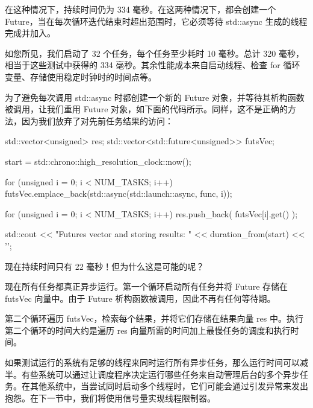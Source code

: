 在这种情况下，持续时间仍为 334 毫秒。在这两种情况下，都会创建一个 Future，当在每次循环迭代结束时超出范围时，它必须等待 std::async 生成的线程完成并加入。

如您所见，我们启动了 32 个任务，每个任务至少耗时 10 毫秒。总计 320 毫秒，相当于这些测试中获得的 334 毫秒。其余性能成本来自启动线程、检查 for 循环变量、存储使用稳定时钟时的时间点等。

为了避免每次调用 std::async 时都创建一个新的 Future 对象，并等待其析构函数被调用，让我们重用 Future 对象，如下面的代码所示。同样，这不是正确的方法，因为我们放弃了对先前任务结果的访问：

\begin{cpp}
std::vector<unsigned> res;
std::vector<std::future<unsigned>> futsVec;

start = std::chrono::high_resolution_clock::now();

for (unsigned i = 0; i < NUM_TASKS; i++) {
    futsVec.emplace_back(std::async(std::launch::async,
                         func, i));
}

for (unsigned i = 0; i < NUM_TASKS; i++) {
    res.push_back( futsVec[i].get() );
}

std::cout << "Futures vector and storing results: "
          << duration_from(start) << '\n';
\end{cpp}

现在持续时间只有 22 毫秒！但为什么这是可能的呢？

现在所有任务都真正异步运行。第一个循环启动所有任务并将 Future 存储在 futsVec 向量中。由于 Future 析构函数被调用，因此不再有任何等待期。

第二个循环遍历 futsVec，检索每个结果，并将它们存储在结果向量 res 中。执行第二个循环的时间大约是遍历 res 向量所需的时间加上最慢任务的调度和执行时间。

如果测试运行的系统有足够的线程来同时运行所有异步任务，那么运行时间可以减半。有些系统可以通过让调度程序决定运行哪些任务来自动管理后台的多个异步任务。在其他系统中，当尝试同时启动多个线程时，它们可能会通过引发异常来发出抱怨。在下一节中，我们将使用信号量实现线程限制器。













